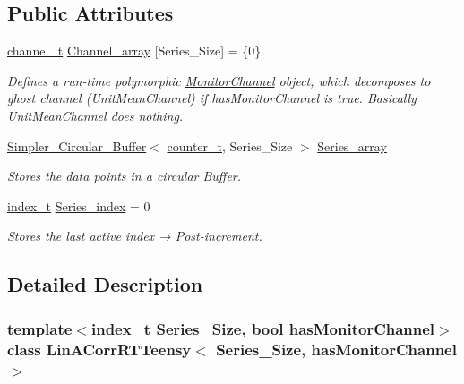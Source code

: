 \subsection*{Public Attributes}
\begin{DoxyCompactItemize}
\item 
\hyperlink{types_8hpp_a9f8f935e7952f42d763385090e3404a5}{channel\+\_\+t} \hyperlink{classLinACorrRTTeensy_a3276cb9bb215af9676edc35958c889b8}{Channel\+\_\+array} \mbox{[}Series\+\_\+\+Size\mbox{]} = \{0\}
\begin{DoxyCompactList}\small\item\em Defines a run-\/time polymorphic \hyperlink{classMonitorChannel}{Monitor\+Channel} object, which decomposes to {\ttfamily ghost} channel (Unit\+Mean\+Channel) if {\ttfamily has\+Monitor\+Channel} is true. Basically {\ttfamily Unit\+Mean\+Channel} does nothing. \end{DoxyCompactList}\item 
\hyperlink{classSimpler__Circular__Buffer}{Simpler\+\_\+\+Circular\+\_\+\+Buffer}$<$ \hyperlink{types_8hpp_a22f279793847eba127de149437848c48}{counter\+\_\+t}, Series\+\_\+\+Size $>$ \hyperlink{classLinACorrRTTeensy_a5c4cc1fe032812d6290579c7c8b22e57}{Series\+\_\+array}
\begin{DoxyCompactList}\small\item\em Stores the data points in a circular Buffer. \end{DoxyCompactList}\item 
\hyperlink{types_8hpp_ab41b824af8e088d090c0b9e60f536c9d}{index\+\_\+t} \hyperlink{classLinACorrRTTeensy_abe0523ada55375281deacb143b6055b7}{Series\+\_\+index} = 0
\begin{DoxyCompactList}\small\item\em Stores the last active index → Post-\/increment. \end{DoxyCompactList}\end{DoxyCompactItemize}


\subsection{Detailed Description}
\subsubsection*{template$<$index\+\_\+t Series\+\_\+\+Size, bool has\+Monitor\+Channel$>$\newline
class Lin\+A\+Corr\+R\+T\+Teensy$<$ Series\+\_\+\+Size, has\+Monitor\+Channel $>$}

